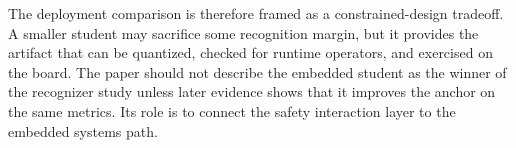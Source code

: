 The deployment comparison is therefore framed as a constrained-design tradeoff. A smaller student may sacrifice some recognition margin, but it provides the artifact that can be quantized, checked for runtime operators, and exercised on the board. The paper should not describe the embedded student as the winner of the recognizer study unless later evidence shows that it improves the anchor on the same metrics. Its role is to connect the safety interaction layer to the embedded systems path.
